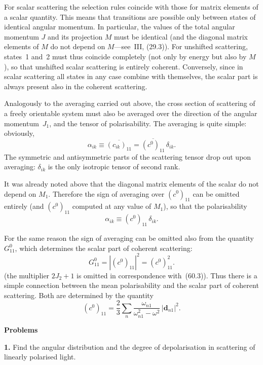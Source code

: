 For scalar scattering the selection rules coincide with those for matrix elements of a scalar quantity. This means that transitions are possible only between states of identical angular momentum. In particular, the values of the total angular momentum $J$ and its projection $M$ must be identical (and the diagonal matrix elements of $M$ do not depend on $M$---see~III, (29.3)). For unshifted scattering, states~1 and~2 must thus coincide completely (not only by energy but also by $M$), so that unshifted scalar scattering is entirely coherent. Conversely, since in scalar scattering all states in any case combine with themselves, the scalar part is always present also in the coherent scattering.

Analogously to the averaging carried out above, the cross section of scattering of a freely orientable system must also be averaged over the direction of the angular momentum~$J_1$, and the tensor of polarisability. The averaging is quite simple: obviously,
\[
\alpha_{ik} \equiv \overline{(c_{ik})_{11}} = \overline{(c^0)_{11}}\,\delta_{ik}.
\]
The symmetric and antisymmetric parts of the scattering tensor drop out upon averaging: $\delta_{ik}$ is the only isotropic tensor of second rank.

It was already noted above that the diagonal matrix elements of the scalar do not depend on $M_1$. Therefore the sign of averaging over $(c^0)_{11}$ can be omitted entirely (and $(c^0)_{11}$ computed at any value of $M_1$), so that the polarisability
\begin{equation}
\alpha_{ik} \equiv (c^0)_{11}\,\delta_{ik}.
\tag{60.9}
\end{equation}

For the same reason the sign of averaging can be omitted also from the quantity $G^0_{11}$, which determines the scalar part of coherent scattering:
\begin{equation}
G^0_{11} = |(c^0)_{11}|^2 = (c^0)^2_{11}.
\tag{60.10}
\end{equation}
(the multiplier $2J_2 + 1$ is omitted in correspondence with~(60.3)). Thus there is a simple connection between the mean polarisability and the scalar part of coherent scattering. Both are determined by the quantity
\begin{equation}
(c^0)_{11} = \frac{2}{3}\sum_n\frac{\omega_{n1}}{\omega^2_{n1} - \omega^2}\,|\mathbf{d}_{n1}|^2.
\tag{60.11}
\end{equation}

\bigskip
\begin{center}\textbf{Problems}\end{center}
\smallskip
\textbf{1.} Find the angular distribution and the degree of depolarisation in scattering of linearly polarised light.

